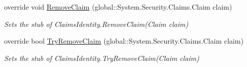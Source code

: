 \begin{DoxyCompactItemize}
override void \hyperlink{class_system_1_1_security_1_1_claims_1_1_fakes_1_1_stub_claims_identity_a3962465983ac04a17fcb1765b12cdd85}{Remove\-Claim} (global\-::\-System.\-Security.\-Claims.\-Claim claim)
\begin{DoxyCompactList}\small\item\em Sets the stub of Claims\-Identity.\-Remove\-Claim(\-Claim claim)\end{DoxyCompactList}\item 
override bool \hyperlink{class_system_1_1_security_1_1_claims_1_1_fakes_1_1_stub_claims_identity_a4cef821d7f2bcf4587041ef9ec0022e2}{Try\-Remove\-Claim} (global\-::\-System.\-Security.\-Claims.\-Claim claim)
\begin{DoxyCompactList}\small\item\em Sets the stub of Claims\-Identity.\-Try\-Remove\-Claim(\-Claim claim)\end{DoxyCompactList}\end{DoxyCompactItemize}
